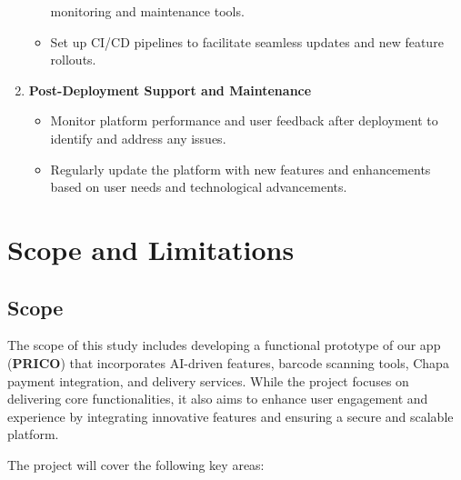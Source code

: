 \documentclass[12pt]{report}
\begin{document}
\begin{enumerate}
\begin{itemize}
		            monitoring and maintenance tools.
		      \item Set up CI/CD pipelines to facilitate seamless updates and new feature
		            rollouts.
	      \end{itemize}
	\item \textbf{Post-Deployment Support and Maintenance}
	      \begin{itemize}
		      \item Monitor platform performance and user feedback after deployment to
		            identify and address any issues.
		      \item Regularly update the platform with new features and enhancements
		            based on user needs and technological advancements.
	      \end{itemize}
\end{enumerate}

\section{Scope and Limitations}

\subsection{Scope}

The scope of this study includes developing a functional prototype of our app (\textbf{PRICO}) that
incorporates AI-driven features, barcode scanning tools, Chapa payment integration, and
delivery services. While the project focuses on delivering core functionalities, it also aims to
enhance user engagement and experience by integrating innovative features and ensuring a
secure and scalable platform.

The project will cover the following key areas:
\end{document}
